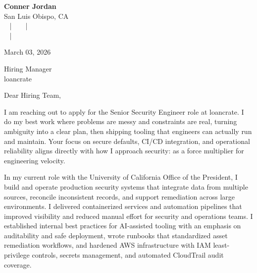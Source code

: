 \documentclass[letterpaper,11pt]{article}
\newcommand{\companyname}{loancrate}
\begin{document}
\begin{center}
  {\Huge \textbf{Conner Jordan}}\\[4pt]
  {\Large San Luis Obispo, CA}\\[4pt]
  \href{tel:+18059759793}{
    } ~ | ~
  \href{mailto:connercharlesjordan@gmail.com}{
    } ~ | ~
   \\
  \href{https://www.linkedin.com/in/conner-jordan-4b268514a/}{
    } ~ | ~
  \href{https://github.com/cjordan223}{
    }
\end{center}

\vspace{16pt}

\begin{flushright}
March 03, 2026
\end{flushright}

Hiring Manager\\
\companyname

\vspace{26pt}

\noindent
Dear Hiring Team,

\vspace{16pt}

I am reaching out to apply for the Senior Security Engineer role at loancrate. I do my best work where problems are messy and constraints are real, turning ambiguity into a clear plan, then shipping tooling that engineers can actually run and maintain. Your focus on secure defaults, CI/CD integration, and operational reliability aligns directly with how I approach security: as a force multiplier for engineering velocity.

\vspace{16pt}

In my current role with the University of California Office of the President, I build and operate production security systems that integrate data from multiple sources, reconcile inconsistent records, and support remediation across large environments. I delivered containerized services and automation pipelines that improved visibility and reduced manual effort for security and operations teams. I established internal best practices for AI-assisted tooling with an emphasis on auditability and safe deployment, wrote runbooks that standardized asset remediation workflows, and hardened AWS infrastructure with IAM least-privilege controls, secrets management, and automated CloudTrail audit coverage.
\end{document}
